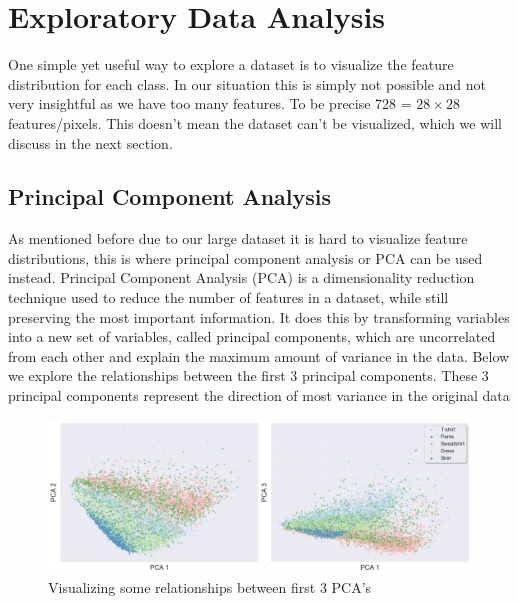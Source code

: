 \section{Exploratory Data Analysis}

One simple yet useful way to explore a dataset is to visualize the feature distribution for each class.
In our situation this is simply not possible and not very insightful as we have too many features.
To be precise 728 = $28\times28$ features/pixels.
This doesn't mean the dataset can't be visualized, which we will discuss in the next section.

\subsection{Principal Component Analysis}\label{subsec:principal-component-analysis}
As mentioned before due to our large dataset it is hard to visualize feature distributions, this is where principal component analysis or PCA can be used instead.
Principal Component Analysis (PCA) is a dimensionality reduction technique used to reduce the number of features in a dataset, while still preserving the most important information.
It does this by transforming variables into a new set of variables, called principal components, which are uncorrelated from each other and explain the maximum amount of variance in the data.
Below we explore the relationships between the first 3 principal components.
These 3 principal components represent the direction of most variance in the original data\\
\begin{figure}[ht]
    \centering
    \includegraphics[scale=0.32]{figures_for_report/PCA}
    \captionsetup{justification=centering,margin=2cm}
    \caption{Visualizing some relationships between first 3 PCA's}\label{fig:figure}
\end{figure}

